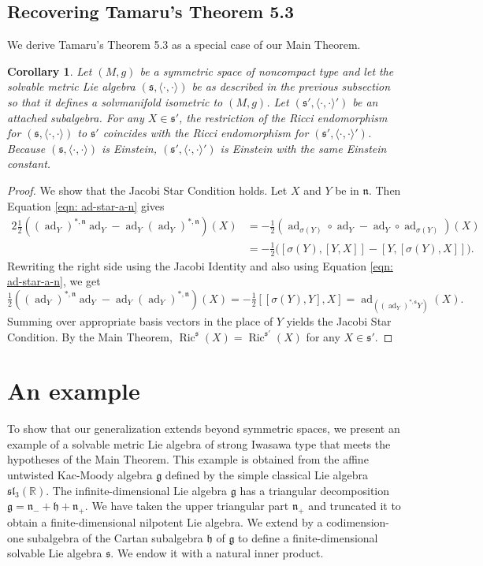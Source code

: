 \documentclass[12pt]{amsart}
\newcommand\boldR{\ensuremath{\mathbb R}}
\newcommand{\frakg}{\ensuremath{\mathfrak{g}} }
\newcommand{\frakh}{\ensuremath{\mathfrak{h}} }
\newcommand{\frakn}{\ensuremath{\mathfrak{n}} }
\newcommand{\fraks}{\ensuremath{\mathfrak{s}} }
\newcommand\fraksl{{\mathfrak{sl}}}
\newcommand\s{{\mathfrak{s}}}
\newcommand\ip{{\langle\cdot {,} \cdot\rangle}}
\newcommand\ad{\operatorname{ad}}
\newcommand{\Ric}{\operatorname{Ric}}
\theoremstyle{plain}
\newtheorem{coro}[theorem]{Corollary}
\theoremstyle{definition}
\theoremstyle{remark}
\numberwithin{equation}{section}
\numberwithin{theorem}{section}
\begin{document}
\subsection{Recovering Tamaru's Theorem 5.3}\label{subsection:  reobtaining Tamaru}
  We derive Tamaru's Theorem 5.3 as a special case of our Main Theorem.
 \begin{coro}\cite[Thm 5.3]{tamaru-11}\label{cor: hiroshi}
Let $(M,g)$ be a  symmetric space of noncompact type and let 
 the solvable  metric Lie algebra $(\fraks, \ip)$ be as described in the previous subsection so that it defines a solvmanifold isometric to $(M,g)$. Let $(\fraks',\ip')$ be an attached subalgebra.
 For any $X \in \s'$, the restriction of the Ricci endomorphism for $(\fraks,\ip)$ to $\fraks'$ coincides with the Ricci endomorphism for $(\fraks',\ip')$.  Because $(\fraks,\ip)$ is Einstein, $(\fraks',\ip')$ is Einstein with the same Einstein constant.
  \end{coro}
  \begin{proof} 
We show that the Jacobi Star Condition holds.   Let $X$ and $Y$ be in $\frakn$.  Then Equation \eqref{eqn: ad-star-a-n}  gives
\begin{alignat*}{2} 
\tfrac12 ((\ad_Y)^{\ast,\frakn} \ad_Y - \ad_Y (\ad_Y)^{\ast,\frakn})(X) &= 
 - \tfrac12 ( \ad_{\sigma(Y)}  \circ \ad_Y - \ad_Y \circ  \ad_{\sigma(Y)}) (X) \\ &= -\tfrac12 \bigl( [\sigma(Y), [Y,X]] - [Y, [\sigma(Y), X]]\bigr).
 \end{alignat*}
 Rewriting the right side
 using the Jacobi Identity and also using Equation 
 \eqref{eqn: ad-star-a-n},  we get  
 \[  \tfrac12 ((\ad_Y)^{\ast,\frakn} \ad_Y - \ad_Y (\ad_Y)^{\ast,\frakn})(X)=-\tfrac12
 [[\sigma(Y),Y], X] = 
\ad_{((\ad_Y)^{\ast,\fraks} Y)} (X). \] 
Summing 
 over appropriate basis vectors in the place of $Y$ yields
 the Jacobi Star Condition. By the Main Theorem, $\Ric^{\s}(X) = \Ric^{\s'}(X)$   for any $X \in \s'$.
  \end{proof}
  
\section{An example}\label{section: example}

To show that our generalization extends beyond symmetric spaces,
 we present an example of a solvable metric Lie algebra of strong Iwasawa type that meets the hypotheses of the Main Theorem. This example is obtained from the affine untwisted Kac-Moody
algebra $\frakg$ defined by the simple classical Lie algebra $\fraksl_3(\boldR).$ The
infinite-dimensional Lie algebra $\frakg$ has a triangular decomposition
$\frakg = \frakn_- + \frakh + \frakn_+.$ We have taken the upper
triangular part $\frakn_+$ and truncated it to obtain a
finite-dimensional nilpotent Lie algebra.  We extend by a
codimension-one subalgebra of the Cartan subalgebra $\frakh$ of $\frakg$ to define a finite-dimensional  solvable Lie algebra $\fraks$.  We endow it with a natural inner product. 
\end{document}
